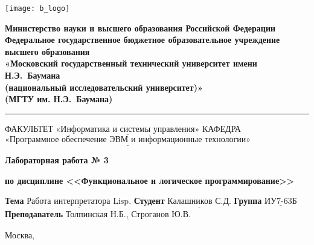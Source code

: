 \thispagestyle{empty}

\noindent \begin{minipage}{0.15\textwidth}
	\texttt{[image: b\_logo]}
\end{minipage}
\noindent\begin{minipage}{0.8\textwidth}\centering
	\textbf{Министерство науки и высшего образования Российской Федерации}\\
	\textbf{Федеральное государственное бюджетное образовательное учреждение высшего образования}\\
	\textbf{«Московский государственный технический университет имени Н.Э.~Баумана}\\
	\textbf{(национальный исследовательский университет)»}\\
	\textbf{(МГТУ им. Н.Э.~Баумана)}
\end{minipage}

\noindent\rule{18cm}{3pt}
\newline\newline
\noindent ФАКУЛЬТЕТ $\underline{\text{«Информатика и системы управления»}}$ \newline\newline
\noindent КАФЕДРА $\underline{\text{«Программное обеспечение ЭВМ и информационные технологии»}}$\newline\newline\newline


\begin{center}
	\noindent\begin{minipage}{1\textwidth}\centering
		\Large\textbf{  Лабораторная работа № 3}
		
		\textbf{по дисциплине <<Функциональное и логическое программирование>>}
		
		\textbf{}
		
		\textbf{}
	\end{minipage}
\end{center}

\noindent\textbf{Тема} $\underline{\text{Работа интерпретатора Lisp.}}$\newline\newline
\noindent\textbf{Студент} $\underline{\text{Калашников С.Д.}}$\newline\newline
\noindent\textbf{Группа} $\underline{\text{ИУ7-63Б}}$\newline\newline
\noindent\textbf{Преподаватель} $\underline{\text{Толпинская Н.Б., Строганов Ю.В.}}$\newline

\begin{center}
	\vfill
	Москва,~\the\year
\end{center}
\clearpage
